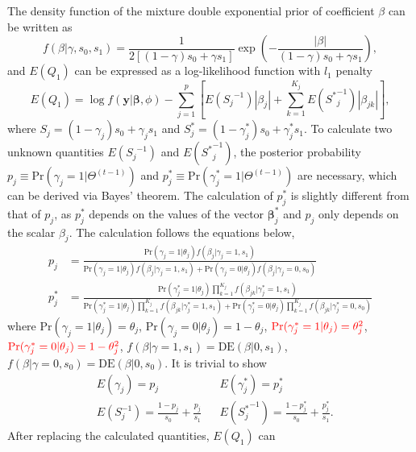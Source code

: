 \documentclass[AMA,STIX1COL,]{WileyNJD-v2}
\begin{document}
The density function of the mixture double exponential prior of
coefficient \(\beta\) can be written as \[
f(\beta|\gamma, s_0, s_1) = \frac{1}{2\left[(1-\gamma)s_0 + \gamma s_1\right]}\exp(-\frac{|\beta|}{(1-\gamma)s_0 + \gamma s_1}),
\] and \(E(Q_1)\) can be expressed as a log-likelihood function with
\(l_1\) penalty \begin{equation}\label{eq:Q1_CD}
E(Q_1) = \log f(\textbf{y}|\boldsymbol{\beta}, \phi) - \sum\limits_{j=1}^p\left[E({S_j}^{-1})|\beta_j|+\sum\limits_{k=1}^{K_j}E({S^{*}}^{-1}_{j})|\beta_{jk}|\right],
\end{equation} where \(S_{j} = (1-\gamma_{j}) s_0 + \gamma_{j} s_1\) and
\(S^*_{j} = (1-\gamma^*_{j}) s_0 + \gamma^*_{j} s_1\). To calculate two
unknown quantities \(E({S_j}^{-1})\) and \(E({S^*}^{-1}_j)\), the
posterior probability
\(p_{j} \equiv \text{Pr}(\gamma_{j}=1|\Theta^{(t-1)})\) and
\(p_{j}^*\equiv \text{Pr}(\gamma^*_{j}=1|\Theta^{(t-1)})\) are
necessary, which can be derived via Bayes' theorem. The calculation of
\(p_j^*\) is slightly different from that of \(p_j\), as \(p_j^*\)
depends on the values of the vector \(\boldsymbol{\beta}^*_{j}\) and
\(p_j\) only depends on the scalar \(\beta_j\). The calculation follows
the equations below, \begin{align*}
p_{j} &= \frac{\text{Pr}(\gamma_{j} = 1|\theta_j)f(\beta_{j}|\gamma_{j}=1, s_1) }{\text{Pr}(\gamma_{j} = 1|\theta_j)f(\beta_{j}|\gamma_{j}=1, s_1) + \text{Pr}(\gamma_{j} = 0|\theta_j)f(\beta_{j}|\gamma_{j}=0, s_0)}\\
p^*_{j} &= \frac{\text{Pr}(\gamma^{*}_{j} = 1|\theta_j)\prod\limits_{k=1}^{K_j}f(\beta_{jk}|\gamma^{*}_{j}=1, s_1) }{\text{Pr}(\gamma^{*}_{j} = 1|\theta_j)\prod\limits_{k=1}^{K_j}f(\beta_{jk}|\gamma^{*}_{j}=1, s_1) + \text{Pr}(\gamma^{*}_{j} = 0|\theta_j)\prod\limits_{k=1}^{K_j}f(\beta_{jk}|\gamma^{*}_{j}=0, s_0)}
\end{align*} where \(\text{Pr}(\gamma_{j} = 1|\theta_j) = \theta_j\),
\(\text{Pr}(\gamma_{j} = 0|\theta_j) = 1-\theta_j\),
\(\textcolor{red}{\text{Pr}(\gamma_{j}^*= 1|\theta_j) = \theta_j^2}\),
\(\textcolor{red}{\text{Pr}(\gamma_{j}^*= 0|\theta_j) = 1-\theta^2_j}\),
\(f(\beta|\gamma=1, s_1) = \text{DE}(\beta|0 , s_1)\),
\(f(\beta|\gamma=0, s_0) = \text{DE}(\beta|0 , s_0)\). It is trivial to
show \begin{align*}\label{eq:exp_scale}
&E(\gamma_{j})  = p_{j} & &E(\gamma^{*}_{j}) = p_{j}^{*}\nonumber\\
&E({S}^{-1}_{j}) = \frac{1-p_{j}}{s_0} + \frac{p_{j}}{s_1} & &E({S_{j}^*}^{-1}) = \frac{1-p_{j}^{*}}{s_0} + \frac{p_{j}^{*}}{s_1}.
\end{align*} After replacing the calculated quantities, \(E(Q_1)\) can
\end{document}
